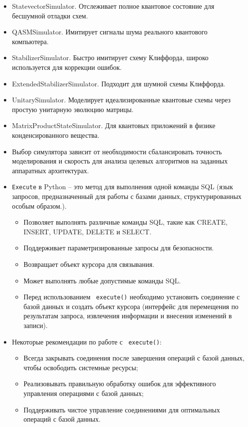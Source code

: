 \documentclass[12pt,a4paper]{article}
\begin{document}
	\begin{itemize}
		
		\item  StatevectorSimulator. Отслеживает полное квантовое состояние для бесшумной отладки схем.
		
		\item  QASMSimulator. Имитирует сигналы шума реального квантового компьютера. 
		\item StabilizerSimulator. Быстро имитирует схему Клиффорда, широко используется для коррекции ошибок.
		
		\item ExtendedStabilizerSimulator. Подходит для шумной схемы Клиффорда.
		
		\item UnitarySimulator. Моделирует идеализированные квантовые схемы через простую унитарную эволюцию матрицы.
		
		\item MatrixProductStateSimulator. Для квантовых приложений в физике конденсированного вещества.
		
		
		\item	Выбор симулятора зависит от необходимости сбалансировать точность моделирования и скорость для анализа целевых алгоритмов на заданных аппаратных архитектурах.
		
		\item	\texttt{Execute} в Python -- это метод для выполнения одной команды SQL (язык запросов, предназначенный для работы с базами данных, структурированных особым образом.).
		\begin{itemize}
			\item Позволяет выполнять различные команды SQL, такие как CREATE, INSERT, UPDATE, DELETE и SELECT.
			\item Поддерживает параметризированные запросы для безопасности.
			\item Возвращает объект курсора для связывания.
			\item Может выполнять любые допустимые команды SQL.
			\item Перед использованием \texttt{ execute()} необходимо установить соединение с базой данных и создать объект курсора (интерфейс для перемещения по результатам запроса, извлечения информации и внесения изменений в записи).
		\end{itemize}
		\item	 Некоторые рекомендации по работе с \texttt{ execute()}:
		\begin{itemize}
			\item Всегда закрывать соединения после завершения операций с базой данных, чтобы освободить системные ресурсы;
			\item Реализовывать правильную обработку ошибок для эффективного управления операциями с базой данных;
			\item Поддерживать чистое управление соединениями для оптимальных операций с базой данных.
		\end{itemize}
		

\end{itemize}
\end{document}
